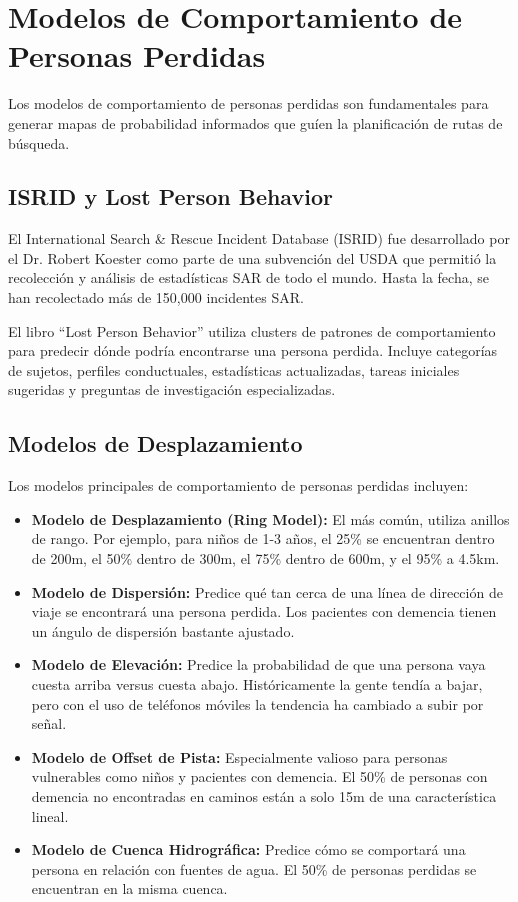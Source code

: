 \documentclass[12pt]{report} %
\begin{document}
\chapter{Modelos de Comportamiento de Personas Perdidas}

Los modelos de comportamiento de personas perdidas son fundamentales para generar mapas de probabilidad informados que guíen la planificación de rutas de búsqueda.

\section{ISRID y Lost Person Behavior}

El International Search \& Rescue Incident Database (ISRID) fue desarrollado por el Dr. Robert Koester como parte de una subvención del USDA que permitió la recolección y análisis de estadísticas SAR de todo el mundo. Hasta la fecha, se han recolectado más de 150,000 incidentes SAR.

El libro ``Lost Person Behavior''\cite{koester2008} utiliza clusters de patrones de comportamiento para predecir dónde podría encontrarse una persona perdida. Incluye categorías de sujetos, perfiles conductuales, estadísticas actualizadas, tareas iniciales sugeridas y preguntas de investigación especializadas.

\section{Modelos de Desplazamiento}

Los modelos principales de comportamiento de personas perdidas incluyen:

\begin{itemize}
	\item \textbf{Modelo de Desplazamiento (Ring Model):} El más común, utiliza anillos de rango. Por ejemplo, para niños de 1-3 años, el 25\% se encuentran dentro de 200m, el 50\% dentro de 300m, el 75\% dentro de 600m, y el 95\% a 4.5km.
	\item \textbf{Modelo de Dispersión:} Predice qué tan cerca de una línea de dirección de viaje se encontrará una persona perdida. Los pacientes con demencia tienen un ángulo de dispersión bastante ajustado.
	\item \textbf{Modelo de Elevación:} Predice la probabilidad de que una persona vaya cuesta arriba versus cuesta abajo. Históricamente la gente tendía a bajar, pero con el uso de teléfonos móviles la tendencia ha cambiado a subir por señal.
	\item \textbf{Modelo de Offset de Pista:} Especialmente valioso para personas vulnerables como niños y pacientes con demencia. El 50\% de personas con demencia no encontradas en caminos están a solo 15m de una característica lineal.
	\item \textbf{Modelo de Cuenca Hidrográfica:} Predice cómo se comportará una persona en relación con fuentes de agua. El 50\% de personas perdidas se encuentran en la misma cuenca.
\end{itemize}
\end{document}
